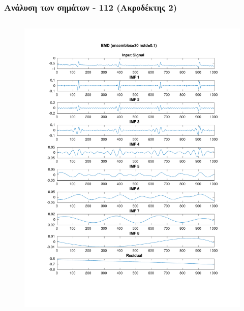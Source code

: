 \documentclass{beamer}
\begin{document}
\begin{frame}
\frametitle{Ανάλυση των σημάτων - 112 (Ακροδέκτης 2)}

\begin{columns}
\begin{figure}
\includegraphics[width=\textwidth]{fig/112l2_emd_ensemble.pdf}
\end{figure}


\end{columns}
\end{frame}
\end{document}

